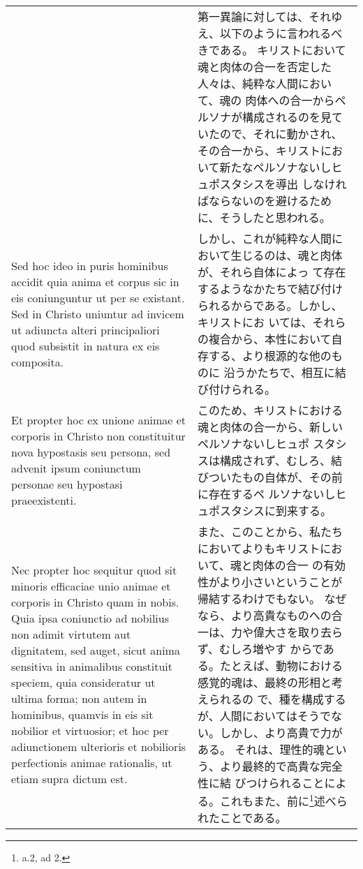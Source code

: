 \documentclass[10pt]{jsarticle} %
\begin{document}
\begin{longtable}{p{21em}p{21em}}
&


第一異論に対しては、それゆえ、以下のように言われるべきである。
キリストにおいて魂と肉体の合一を否定した人々は、純粋な人間において、魂の
 肉体への合一からペルソナが構成されるのを見ていたので、それに動かされ、
 その合一から、キリストにおいて新たなペルソナないしヒュポスタシスを導出
 しなければならないのを避けるために、そうしたと思われる。



\\

Sed hoc ideo in puris hominibus accidit quia anima et corpus
sic in eis coniunguntur ut per se existant. Sed in Christo uniuntur ad
invicem ut adiuncta alteri principaliori quod subsistit in natura ex eis
composita. 


&

しかし、これが純粋な人間において生じるのは、魂と肉体が、それら自体によっ
 て存在するようなかたちで結び付けられるからである。しかし、キリストにお
 いては、それらの複合から、本性において自存する、より根源的な他のものに
 沿うかたちで、相互に結び付けられる。

\\

Et propter hoc ex unione animae et corporis in Christo non
constituitur nova hypostasis seu persona, sed advenit ipsum coniunctum
personae seu hypostasi praeexistenti. 


&

このため、キリストにおける魂と肉体の合一から、新しいペルソナないしヒュポ
 スタシスは構成されず、むしろ、結びついたもの自体が、その前に存在するペ
 ルソナないしヒュポスタシスに到来する。

\\

Nec propter hoc sequitur quod sit
minoris efficaciae unio animae et corporis in Christo quam in
nobis. Quia ipsa coniunctio ad nobilius non adimit virtutem aut
dignitatem, sed auget, sicut anima sensitiva in animalibus constituit
speciem, quia consideratur ut ultima forma; non autem in hominibus,
quamvis in eis sit nobilior et virtuosior; et hoc per adiunctionem
ulterioris et nobilioris perfectionis animae rationalis, ut etiam supra
dictum est.


&

また、このことから、私たちにおいてよりもキリストにおいて、魂と肉体の合一
 の有効性がより小さいということが帰結するわけでもない。
なぜなら、より高貴なものへの合一は、力や偉大さを取り去らず、むしろ増やす
 からである。たとえば、動物における感覚的魂は、最終の形相と考えられるの
 で、種を構成するが、人間においてはそうでない。しかし、より高貴で力がある。
それは、理性的魂という、より最終的で高貴な完全性に結
 びつけられることによる。これもまた、前に\footnote{a.2, ad 2.}述べられたことである。


\end{longtable}
\end{document}
